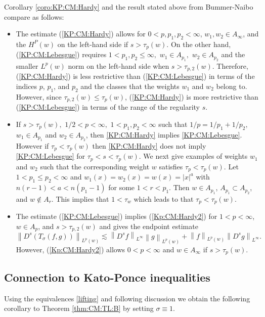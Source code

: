 \documentclass[10pt,a4paper]{article}
\theoremstyle{remark}
\newcommand{\norm}[2]{\left\|#1\right\|_{#2}}
\newcommand{\hcline}{1/p=1/p_1+1/p_2}
\begin{document}
Corollary \ref{coro:KP:CM:Hardy} and the result stated above from Bummer-Naibo compare as follows: 

\begin{itemize}
\item The estimate (\ref{KP:CM:Hardy}) allows for $0<p,p_1,p_2 < \infty$, $w_1,w_2 \in A_\infty$, and the $H^P(w)$ on the left-hand side if $s>\tau_p(w)$. On the other hand, (\ref{KP:CM:Lebesgue}) requires $1<p_1,p_2\le \infty,$ $w_1\in A_{p_1},$ $w_2\in A_{p_2}$ and the smaller $L^p(w)$ norm on the left-hand side when $s>\tau_{p,2}(w)$. Therefore, (\ref{KP:CM:Hardy}) is less restrictive than (\ref{KP:CM:Lebesgue}) in terms of the indices $p$, $p_1$, and $p_2$ and the classes that the weights $w_1$ and $w_2$ belong to. However, since $\tau_{p,2}(w) \leq \tau_p(w)$, (\ref{KP:CM:Hardy}) is more restrictive than (\ref{KP:CM:Lebesgue}) in terms of the range of the regularity $s$.
\item If $s>\tau_{p}(w),$   $1/2<p<\infty,$ $1<p_1,p_2<\infty$ such that $\hcline,$  $w_1\in A_{p_1}$ and $w_2\in A_{p_2}$, then \eqref{KP:CM:Hardy} implies \eqref{KP:CM:Lebesgue}. However if $\tau_p < \tau_p(w)$ then \eqref{KP:CM:Hardy} does not imply \eqref{KP:CM:Lebesgue} for $\tau_p < s < \tau_p(w)$. We next give examples of weights $w_1$ and $w_2$ such that the corresponding weight $w$ satisfies $\tau_p < \tau_p(w)$.  Let $1<p_1\leq p_2 <\infty$ and $w_1(x) = w_2(x) = w(x) = |x|^a$ with $n(r-1)<a<n(p_1-1)$ for some $1<r<p_1$. Then $w \in A_{p_1}$, $A_{p_1} \subset A_{p_2}$, and $w \notin A_r$. This implies that $1<\tau_w$ which leads to that $\tau_p < \tau_p(w)$. 
\item  The estimate (\ref{KP:CM:Lebesgue}) implies (\ref{Kp:CM:Hardy2}) for $1<p<\infty$, $w\in A_p$, and $s>\tau_{p,2}(w)$ and gives the endpoint estimate 
$$ \norm{D^s(T_\sigma(f,g))}{L^p(w)} \lesssim \norm{D^s f}{L^{\infty}} \norm{g}{L^{p}(w)} +  \norm{f}{L^{p}(w)}\norm{D^s g}{L^\infty}. $$
However, (\ref{Kp:CM:Hardy2}) allows $0<p<\infty$ and $w\in A_\infty$ if $s>\tau_p (w)$.
\end{itemize}

\subsection{Connection to Kato-Ponce inequalities}
Using the equivalences \ref{lifting} and following discussion we obtain the following corollary to Theorem \ref{thm:CM:TL:B} by setting $\sigma \equiv 1$. 
\end{document}

